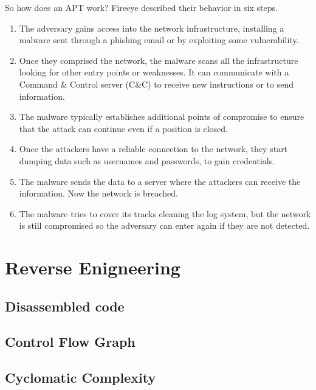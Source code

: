 So how does an APT work? Fireeye described their behavior in six steps. \cite{fireeye_anatomy}


\begin{enumerate}
	\item The adversary gains access into the network infrastructure, installing a malware sent through a phishing email or by exploiting some vulnerability.
	\item Once they comprised the network, the malware scans all the infrastructure looking for other entry points or weaknesses. It can communicate with a Command \& Control server (C\&C) to receive new instructions or to send information.
	\item The malware typically establishes additional points of compromise to ensure that the attack can continue even if a position is closed.
	\item Once the attackers have a reliable connection to the network, they start dumping data such as usernames and passwords, to gain credentials.
	
	\item The malware sends the data to a server where the attackers can receive the information. Now the network is breached.
	
	\item The malware tries to cover its tracks cleaning the log system, but the network is still compromised so the adversary can enter again if they are not detected.
	
\end{enumerate}

\section{Reverse Enigneering}

\subsection{Disassembled code}
\subsection{Control Flow Graph}

\subsection{Cyclomatic Complexity}



